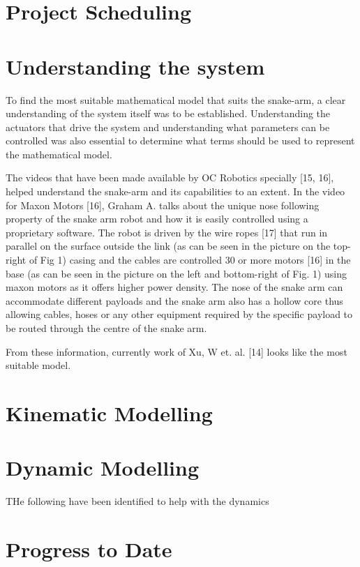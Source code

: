 \documentclass[a4paper,12pt]{report}
\begin{document}
\section{Project Scheduling}
\section{Understanding the system}
To find the most suitable mathematical model that suits the snake-arm, a clear understanding of the system itself was to be established. Understanding the actuators that drive the system and understanding what parameters can be controlled was also essential to determine what terms should be used to represent the mathematical model.

The videos that have been made available by OC Robotics specially [15, 16], helped understand the snake-arm and its capabilities to an extent. In the video for Maxon Motors [16], Graham A. talks about the unique nose following property of the snake arm robot and how it is easily controlled using a proprietary software. The robot is driven by the wire ropes [17] that run in parallel on the surface outside the link (as can be seen in the picture on the top-right of Fig 1) casing and the cables are controlled 30 or more motors [16] in the base (as can be seen in the picture on the left and bottom-right of Fig. 1) using maxon motors as it offers higher power density. The nose of the snake arm can accommodate different payloads and the snake arm also has a hollow core thus allowing cables, hoses or any other equipment required by the specific payload to be routed through the centre of the snake arm.

From these information, currently work of Xu, W et. al. [14] looks like the most suitable model. 

\section{Kinematic Modelling}
\section{Dynamic Modelling}
THe following have been identified to help with the dynamics
\cite{mu_liu_xu_lou_liang_2019} 
\section{Progress to Date}

\end{document}
